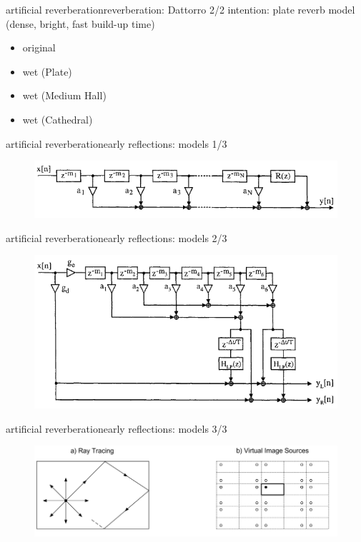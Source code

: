 \begin{frame}{artificial reverberation}{reverberation: Dattorro 2/2}
	intention: plate reverb model \pause (dense, bright, fast build-up time)
    \bigskip
    \begin{itemize}
        \item   original 
        \item   wet (Plate) 
        \item   wet (Medium Hall) 
        \item   wet (Cathedral) 
    \end{itemize}
\end{frame}

\begin{frame}{artificial reverberation}{early reflections: models 1/3}
	\begin{figure}
		\centerline{\includegraphics[scale=.6]{graph/er_simple}}
	\end{figure}
\end{frame}

\begin{frame}{artificial reverberation}{early reflections: models 2/3}
	\begin{figure}
		\centerline{\includegraphics[scale=.6]{graph/erstandard}}
	\end{figure}
\end{frame}

\begin{frame}{artificial reverberation}{early reflections: models 3/3}
	\begin{figure}
		\centerline{\includegraphics[scale=.4]{graph/raummodell}}
	\end{figure}
\end{frame}

